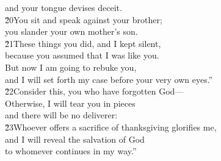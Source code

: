 \begin{poetry}
\poemll    and your tongue devises deceit. \\
\poeml \v{20}You sit and speak against your brother; \\
\poemll    you slander your own mother's son. \\
\poeml \v{21}These things you did, and I kept silent, \\
\poemll    because you assumed that I was like you. \\
\poeml But now I am going to rebuke you, \\
\poemll    and I will set forth my case before your very own eyes.'' \\
\poeml \v{22}Consider this, you who have forgotten God--- \\
\poemll    Otherwise, I will tear you in pieces \\
\poemlll       and there will be no deliverer: \\
\poeml \v{23}Whoever offers a sacrifice of thanksgiving glorifies me, \\
\poemll    and I will reveal the salvation of God \\
\poemlll       to whomever continues in my way.''
\end{poetry}

